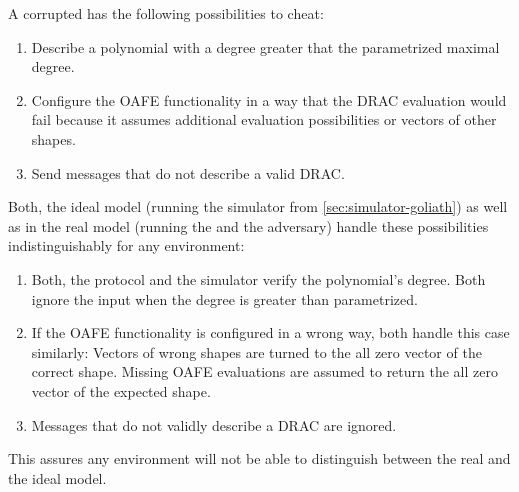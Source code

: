 
A corrupted \JWpOne{} has the following possibilities to cheat:

\begin{enumerate}

  \item Describe a polynomial with a degree greater that the parametrized
    maximal degree.

  \item Configure the OAFE functionality in a way that the DRAC evaluation would
    fail because it assumes additional evaluation possibilities or vectors of
    other shapes.

  \item Send messages that do not describe a valid DRAC.

\end{enumerate}

Both, the ideal model (running the simulator from \ref{sec:simulator-goliath})
as well as in the real model (running the \JWprotoSymOPE{} and the adversary)
handle these possibilities indistinguishably for any environment:

\begin{enumerate}

  \item Both, the protocol and the simulator verify the polynomial's degree.
    Both ignore the input when the degree is greater than parametrized.

  \item If the OAFE functionality is configured in a wrong way, both handle this
    case similarly: Vectors of wrong shapes are turned to the all zero vector of
    the correct shape. Missing OAFE evaluations are assumed to return the all
    zero vector of the expected shape.

  \item Messages that do not validly describe a DRAC are ignored.

\end{enumerate}

This assures any environment will not be able to distinguish between the real
and the ideal model.

